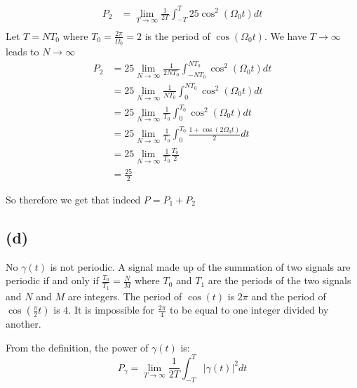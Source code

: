 \documentclass[12pt]{article}
\begin{document}
\begin{align*}
P_2&=\lim_{T\to\infty}\frac{1}{2T}\int_{-T}^{T} 25\cos^2(\Omega_0 t)dt\\
\end{align*}
Let $T=NT_0$ where $T_0=\frac{2\pi}{\Omega_0}=2$ is the period of  $\cos(\Omega_0 t)$. We have $T\to\infty$ leads to $N\to\infty$
\begin{align*}
P_2&=25\lim_{N\to\infty}\frac{1}{2NT_0}\int_{-NT_0}^{NT_0} \cos^2(\Omega_0 t)dt\\
&=25\lim_{N\to\infty}\frac{1}{NT_0}\int_{0}^{NT_0} \cos^2(\Omega_0 t)dt\\
&=25\lim_{N\to\infty}\frac{1}{T_0}\int_{0}^{T_0} \cos^2(\Omega_0 t)dt\\
&=25\lim_{N\to\infty}\frac{1}{T_0}\int_{0}^{T_0} \frac{1+\cos(2\Omega_0 t)}{2}dt\\
&=25\lim_{N\to\infty}\frac{1}{T_0}\frac{T_0}{2}\\
&=\frac{25}{2}
\end{align*}

So therefore we get that indeed $P=P_1+P_2$

\subsection*{(d)}
No $\gamma(t)$ is not periodic. A signal made up of the summation of two signals are periodic if and only if $\frac{T_0}{T_1}=\frac{N}{M}$ where $T_0$ and $T_1$ are the periods of the two signals and $N$ and $M$ are integers. The period of $\cos(t)$ is $2\pi$ and the period of $\cos(\frac{\pi}{2}t)$ is $4$. It is impossible for $\frac{2\pi}{4}$ to be equal to one integer divided by another.


From the definition, the power of $\gamma(t)$ is:
$$P_{\gamma}=\lim_{T\to\infty}\frac{1}{2T}\int_{-T}^{T}|\gamma(t)|^2dt$$
\end{document}
